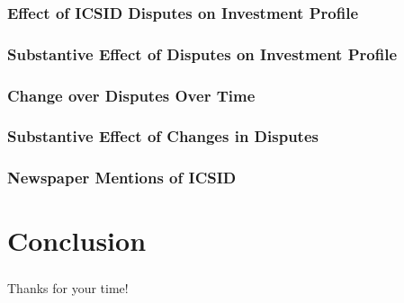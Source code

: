 \documentclass[10pt]{beamer}
\begin{document}
\begin{frame}
\frametitle{Effect of ICSID Disputes on Investment Profile}

\pause
\begin{figure}[ht]
	\centering
	\vspace{-5mm}	
	\resizebox{1\textwidth}{!}{}
\end{figure}

\end{frame}

\begin{frame}
\frametitle{Substantive Effect of Disputes on Investment Profile}

\pause
\begin{figure}[ht]
	\centering
	\resizebox{1\textwidth}{!}{}	
\end{figure}

\end{frame}

\begin{frame}
\frametitle{Change over Disputes Over Time}

\pause
\begin{figure}[ht]
	\centering
	\resizebox{1\textwidth}{!}{}	
\end{figure}

\end{frame}

\begin{frame}
\frametitle{Substantive Effect of Changes in Disputes}

\pause
\begin{figure}[ht]
	\centering
	\resizebox{1\textwidth}{!}{}	
\end{figure}

\end{frame}

\begin{frame}
\frametitle{Newspaper Mentions of ICSID}

\begin{figure}[ht]
	\centering
	\resizebox{1\textwidth}{!}{}
\end{figure}

\end{frame}

\section{Conclusion}

\begin{frame}
\frametitle{}

\begin{center}
Thanks for your time!
\end{center}

\end{frame}
\end{document}
